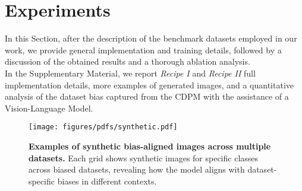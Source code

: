 \section{Experiments}
In this Section, after the description of the benchmark datasets employed in our work, we provide general implementation and training details, followed by a discussion of the obtained results and a thorough ablation analysis. 
\\
In the Supplementary Material, we report \textit{Recipe I} and \textit{Recipe II} full implementation details, more examples of generated images, and a quantitative analysis of the dataset bias captured from the CDPM with the assistance of a Vision-Language Model.
\label{sec:experiments}
\begin{figure*}[!ht]
  \centering
  \texttt{[image: figures/pdfs/synthetic.pdf]}
  \caption{\textbf{Examples of synthetic bias-aligned images across multiple datasets.} Each grid shows synthetic images for specific classes across biased datasets, revealing how the model aligns with dataset-specific biases in different contexts.}
  \label{fig:synthetic_images}
\end{figure*}
